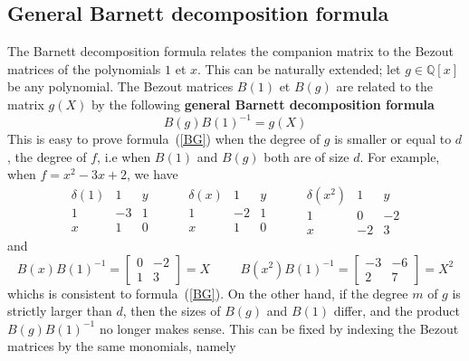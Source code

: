 \documentclass{standalone}
\begin{document}
\begin{rem}
\subsection{General Barnett decomposition formula}
\label{Bar_gen}
The Barnett decomposition formula relates the companion matrix to the Bezout matrices of the polynomials $1$ et $x$.
This can be naturally extended; let $g \in \mathbb{Q}[x]$ be any polynomial.
The Bezout matrices $B(1)$ et $B(g)$ are related to the matrix $g(X)$ by the following {\bf general Barnett decomposition formula}
\begin{equation}
	\label{BG}
	B(g)B(1)^{-1} = g(X)
\end{equation}
This is easy to prove formula~(\ref{BG}) when the degree of $g$ is smaller or equal to $d$, the degree of $f$, i.e when $B(1)$ and $B(g)$ both are of size $d$. For example, when $f = x^2 - 3x + 2$, we have
$$
\begin{array}{c|cc}
	\delta(1) & 1 & y \\
	\hline
	1 & -3 & 1 \\
	x & 1 & 0
\end{array}
\hspace{1cm}
\begin{array}{c|cc}
	\delta(x) & 1 & y \\
	\hline
	1 & -2 & 1 \\
	x & 1 & 0
\end{array}
\hspace{1cm}
\begin{array}{c|cc}
	\delta(x^2) & 1 & y \\
	\hline
	1 & 0 & -2 \\
	x & -2 & 3
\end{array}
$$
and
\begin{equation}
	B(x)B(1)^{-1} =
	\begin{bmatrix}
		0 & -2 \\
		1 & 3
	\end{bmatrix}
	= X
	\hspace{1cm}
	B(x^2)B(1)^{-1} =
	\begin{bmatrix}
		-3 & -6 \\
		2 & 7
	\end{bmatrix}
	= X^2
\end{equation}
whichs is consistent to formula~(\ref{BG}).
On the other hand, if the degree $m$ of $g$ is strictly larger than $d$, then the sizes of $B(g)$ and $B(1)$ differ, and the product $B(g)B(1)^{-1}$ no longer makes sense. This can be fixed by indexing the Bezout matrices by the same monomials, namely

\end{rem}
\end{document}
